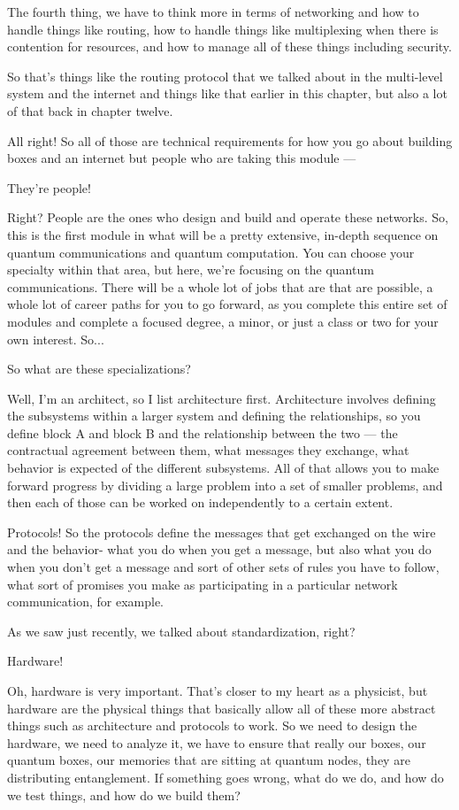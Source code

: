 \mmm The fourth thing, we have to think more in terms of networking and how to handle things like routing, how to handle things like multiplexing when there is contention for resources, and how to manage all of these things including security.

\rrr So that's things like the routing protocol that we talked about in the multi-level system and the internet and things like that earlier in this chapter, but also a lot of that back in chapter twelve.

All right! So all of those are technical requirements for how you go about building boxes and an internet but people who are taking this module ---

\mmm They're people! 

\rrr Right? People are the ones who design and build and operate these networks. So, this is the first module in what will be a pretty extensive, in-depth sequence on quantum communications and quantum computation. You can choose your specialty within that area, but here, we're focusing on the quantum communications. There will be a whole lot of jobs that are that are possible, a whole lot of career paths for you to go forward, as you complete this entire set of modules and complete a focused degree, a minor, or just a class or two for your own interest. So...

\mmm So what are these specializations?

\rrr Well, I'm an architect, so I list architecture first. Architecture involves defining the subsystems within a larger system and defining the relationships, so you define block A and block B and the relationship between the two --- the contractual agreement between them, what messages they exchange, what behavior is expected of the different subsystems. All of that allows you to make forward progress by dividing a large problem into a set of smaller problems, and then each of those can be worked on independently to a certain extent.

Protocols! So the protocols define the messages that get exchanged on the wire and the behavior- what you do when you get a message, but also what you do when you don't get a message and sort of other sets of rules you have to follow, what sort of promises you make as participating in a particular network communication, for example.

As we saw just recently, we talked about standardization, right?

Hardware!

\mmm Oh, hardware is very important. That's closer to my heart as a physicist, but hardware are the physical things that basically allow all of these more abstract things such as architecture and protocols to work. So we need to design the hardware, we need to analyze it, we have to ensure that really our boxes, our quantum boxes, our memories that are sitting at quantum nodes, they are distributing entanglement. If something goes wrong, what do we do, and how do we test things, and how do we build them?

